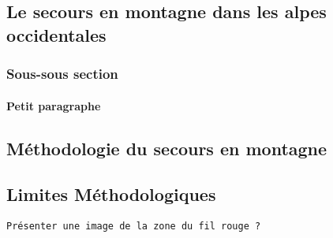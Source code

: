 \subsection{Le secours en montagne dans les alpes occidentales}
\label{subsec:1-1-1}

\subsubsection{Sous-sous section}
\label{subsubsec:1-1-1-1}

\paragraph{Petit paragraphe}
\label{par:1-1-1-1-1}

\subsection{Méthodologie du secours en montagne}
\label{susec:1-1-2}

\subsection{Limites Méthodologiques}
\label{subsec:1-1-3}

\texttt{Présenter une image de la zone du fil rouge ?}